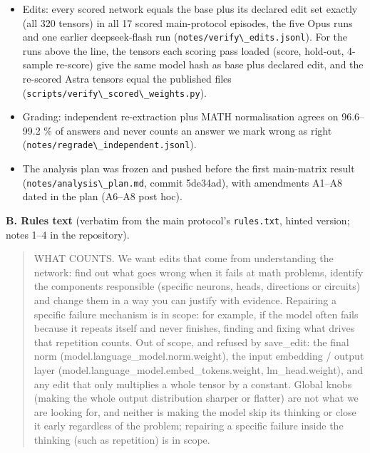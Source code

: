 \documentclass[
  10pt,
]{article}
\newcommand{\passthrough}[1]{#1}
\providecommand{\tightlist}{%
  \setlength{\itemsep}{0pt}\setlength{\parskip}{0pt}}
\begin{document}
\begin{itemize}
\tightlist
\item
  Edits: every scored network equals the base plus its declared edit set
  exactly (all 320 tensors) in all 17 scored main-protocol episodes, the
  five Opus runs and one earlier deepseek-flash run
  (\passthrough{\lstinline!notes/verify\_edits.jsonl!}). For the runs
  above the line, the tensors each scoring pass loaded (score, hold-out,
  4-sample re-score) give the same model hash as base plus declared
  edit, and the re-scored Astra tensors equal the published files
  (\passthrough{\lstinline!scripts/verify\_scored\_weights.py!}).
\item
  Grading: independent re-extraction plus MATH normalisation agrees on
  96.6--99.2 \% of answers and never counts an answer we mark wrong as
  right (\passthrough{\lstinline!notes/regrade\_independent.jsonl!}).
\item
  The analysis plan was frozen and pushed before the first main-matrix
  result (\passthrough{\lstinline!notes/analysis\_plan.md!}, commit
  5de34ad), with amendments A1--A8 dated in the plan (A6--A8 post hoc).
\end{itemize}

\textbf{B. Rules text} (verbatim from the main protocol's
\passthrough{\lstinline!rules.txt!}, hinted version; notes 1--4 in the
repository).

\begin{quote}
WHAT COUNTS. We want edits that come from understanding the network:
find out what goes wrong when it fails at math problems, identify the
components responsible (specific neurons, heads, directions or circuits)
and change them in a way you can justify with evidence. Repairing a
specific failure mechanism is in scope: for example, if the model often
fails because it repeats itself and never finishes, finding and fixing
what drives that repetition counts. Out of scope, and refused by
save\_edit: the final norm (model.language\_model.norm.weight), the
input embedding / output layer
(model.language\_model.embed\_tokens.weight, lm\_head.weight), and any
edit that only multiplies a whole tensor by a constant. Global knobs
(making the whole output distribution sharper or flatter) are not what
we are looking for, and neither is making the model skip its thinking or
close it early regardless of the problem; repairing a specific failure
inside the thinking (such as repetition) is in scope.
\end{quote}
\end{document}
